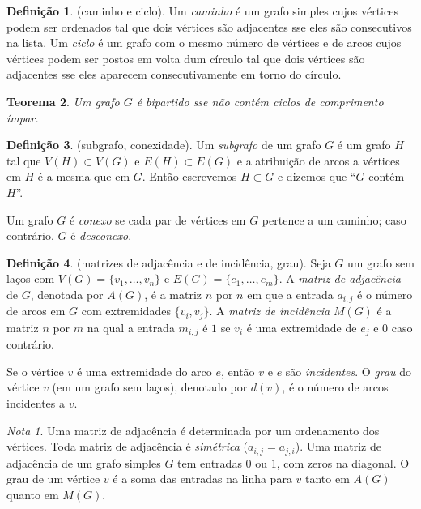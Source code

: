 \documentclass{article}
\theoremstyle{plain}
\newtheorem{thm}{Teorema}[section]
\theoremstyle{definition}
\newtheorem{defn}[thm]{Definição}
\theoremstyle{remark}
\newtheorem*{rem}{Nota}
\begin{document}
\begin{defn} (caminho e ciclo).
    Um \emph{caminho} é um grafo simples cujos vértices podem ser ordenados tal que dois vértices são adjacentes sse eles são consecutivos na lista.
    Um \emph{ciclo} é um grafo com o mesmo número de vértices e de arcos cujos vértices podem ser postos em volta dum círculo tal que dois vértices são adjacentes sse eles aparecem consecutivamente em torno do círculo.
\end{defn}

\begin{thm}
    Um grafo \(G\) é bipartido sse não contém ciclos de comprimento ímpar.
\end{thm}

\begin{defn} (subgrafo, conexidade).
    Um \emph{subgrafo} de um grafo \(G\) é um grafo \(H\) tal que \(V(H) \subset V(G)\) e \(E(H) \subset E(G)\) e a atribuição de arcos a vértices em \(H\) é a mesma que em \(G\).
    Então escrevemos \(H \subset G\) e dizemos que ``\(G\) contém \(H\)''.
    
    Um grafo \(G\) é \emph{conexo} se cada par de vértices em \(G\) pertence a um caminho; caso contrário, \(G\) é \emph{desconexo}.
\end{defn}

\begin{defn} (matrizes de adjacência e de incidência, grau).
    Seja \(G\) um grafo sem laços com \(V(G) = \{v_1, \ldots, v_n\}\) e \(E(G) = \{e_1, \ldots, e_m\}\). A \emph{matriz de adjacência} de \(G\), denotada por \(A(G)\), é a matriz \(n\) por \(n\) em que a entrada \(a_{i,j}\)
    é o número de arcos em \(G\) com extremidades \(\{v_i, v_j\}\). A \emph{matriz de incidência} \(M(G)\) é a matriz \(n\) por \(m\) na qual a entrada \(m_{i,j}\) é \(1\) se \(v_i\) é uma extremidade de \(e_j\) e 0 caso contrário.

    Se o vértice \(v\) é uma extremidade do arco \(e\), então \(v\) e \(e\) são \emph{incidentes}. O \emph{grau} do vértice \(v\) (em um grafo sem laços), denotado por \(d(v)\), é o número de arcos incidentes a \(v\).
\end{defn}

\begin{rem}
    Uma matriz de adjacência é determinada por um ordenamento dos vértices. Toda matriz de adjacência é \emph{simétrica} (\(a_{i,j}=a_{j,i}\)). Uma matriz de adjacência de um grafo simples \(G\) tem entradas \(0\) ou \(1\), com zeros na diagonal. O grau de um vértice \(v\) é a soma das entradas na linha para \(v\) tanto em \(A(G)\) quanto em \(M(G)\).
\end{rem}
\end{document}
